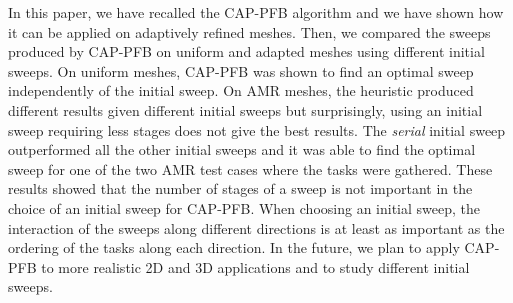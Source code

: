 \documentclass{mc2015}
\renewcommand{\(}{\left(}
\renewcommand{\)}{\right)}
\renewcommand{\[}{\left[}
\renewcommand{\]}{\right]}
\begin{document}
In this paper, we have recalled the CAP-PFB algorithm and we have shown how it
can be applied on adaptively refined meshes. Then, we compared the sweeps
produced by CAP-PFB on uniform and adapted meshes using different initial
sweeps. On uniform meshes, CAP-PFB was shown to find an optimal sweep
independently of the initial sweep. On AMR meshes, the heuristic produced
different results given different initial sweeps but surprisingly, using an
initial sweep requiring less stages does not give the best results. The
\emph{serial} initial sweep outperformed all the other initial sweeps and it was
able to find the optimal sweep for one of the two AMR test cases where the tasks
were gathered. These results showed that the number of stages of a sweep is not
important in the choice of an initial sweep for CAP-PFB. When choosing an
initial sweep, the interaction of the sweeps along different directions is at
least as important as the ordering of the tasks along each direction. In the
future, we
plan to apply CAP-PFB to more realistic 2D and 3D applications and to study different
initial sweeps.


\setlength{\baselineskip}{12pt}




\end{document}
